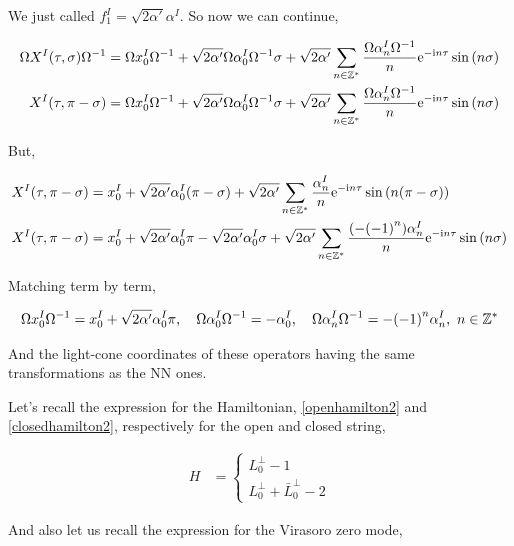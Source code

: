We just called $f_1^I=\sqrt{2\alpha'}\alpha^I$. So now we can continue,

\begin{align*}
    \Omega X^I\qty(\tau,\sigma)\Omega^{-1}&=\Omega x_0^I\Omega^{-1}+\sqrt{2\alpha'}\Omega\alpha_0^I\Omega^{-1}\sigma+\sqrt{2\alpha'}\sum\limits_{n\in\mathbb Z^\ast}\frac{\Omega\alpha_n^I\Omega^{-1}}{n}\textnormal{e}^{-\textnormal{i} n \tau}\sin\qty(n\sigma)\\
    X^I\qty(\tau,\pi-\sigma)&=\Omega x_0^I\Omega^{-1}+\sqrt{2\alpha'}\Omega\alpha_0^I\Omega^{-1}\sigma+\sqrt{2\alpha'}\sum\limits_{n\in\mathbb Z^\ast}\frac{\Omega\alpha_n^I\Omega^{-1}}{n}\textnormal{e}^{-\textnormal{i} n \tau}\sin\qty(n\sigma)
\end{align*}

But,

\begin{align*}
    X^I\qty(\tau,\pi-\sigma)&=x_0^I+\sqrt{2\alpha'}\alpha_0^I\qty(\pi-\sigma)+\sqrt{2\alpha'}\sum\limits_{n\in\mathbb Z^\ast}\frac{\alpha_n^I}{n}\textnormal{e}^{-\textnormal{i} n \tau}\sin\qty(n\qty(\pi-\sigma))\\
    X^I\qty(\tau,\pi-\sigma)&=x_0^I+\sqrt{2\alpha'}\alpha_0^I\pi-\sqrt{2\alpha'}\alpha_0^I\sigma+\sqrt{2\alpha'}\sum\limits_{n\in\mathbb Z^\ast}\frac{\qty(-\qty(-1)^n)\alpha_n^I}{n}\textnormal{e}^{-\textnormal{i} n \tau}\sin\qty(n\sigma)
\end{align*}

Matching term by term,

\begin{align*}
    \Omega x_0^I\Omega^{-1}=x_0^I+\sqrt{2\alpha'}\alpha_0^I\pi,\ \ \ \Omega \alpha_0^I\Omega^{-1}=-\alpha_0^I,\ \ \ \Omega \alpha_n^I\Omega^{-1}=-\qty(-1)^{n}\alpha_n^I,\ n\in\mathbb Z^\ast
\end{align*}

And the light-cone coordinates of these operators having the same transformations as the NN ones.

\probitem{}

Let's recall the expression for the Hamiltonian, \ref{openhamilton2} and \ref{closedhamilton2}, respectively for 
the open and closed string,

\begin{align*}
    H&=\begin{cases}
        L_0^\perp-1\\L_0^\perp+{\bar L}_0^\perp-2
    \end{cases}
\end{align*}

And also let us recall the expression for the Virasoro zero mode,

